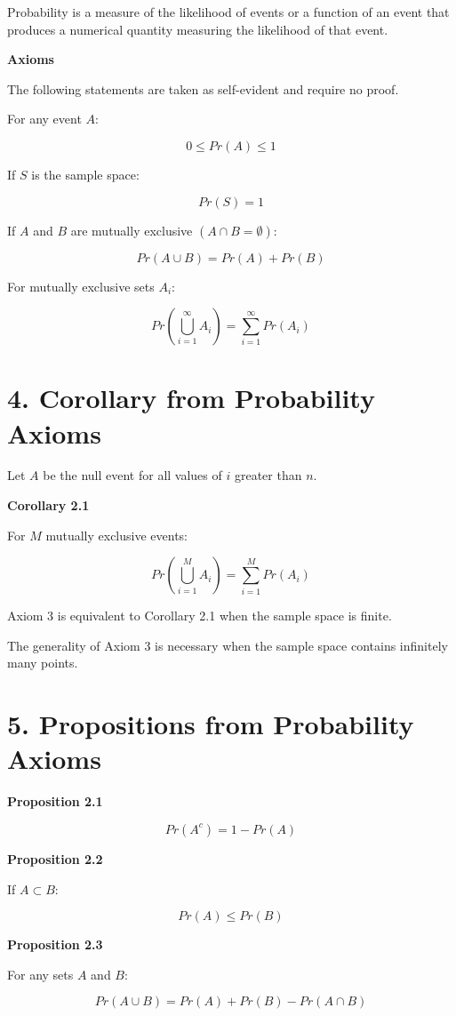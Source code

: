 \documentclass[12pt]{article}
\begin{document}
Probability is a measure of the likelihood of events or a function of an event that produces a numerical quantity measuring the likelihood of that event.

\textbf{Axioms}

The following statements are taken as self-evident and require no proof.

For any event $A$:

\[
0 \le Pr(A) \le 1
\]

If $S$ is the sample space:

\[
Pr(S) = 1
\]

If $A$ and $B$ are mutually exclusive $(A \cap B = \emptyset)$:

\[
Pr(A \cup B) = Pr(A) + Pr(B)
\]

For mutually exclusive sets $A_i$:

\[
Pr\left(\bigcup_{i=1}^{\infty} A_i \right) =
\sum_{i=1}^{\infty} Pr(A_i)
\]

\section*{4. Corollary from Probability Axioms}

Let $A$ be the null event for all values of $i$ greater than $n$.

\textbf{Corollary 2.1}

For $M$ mutually exclusive events:

\[
Pr\left(\bigcup_{i=1}^{M} A_i \right) =
\sum_{i=1}^{M} Pr(A_i)
\]

Axiom 3 is equivalent to Corollary 2.1 when the sample space is finite.

The generality of Axiom 3 is necessary when the sample space contains infinitely many points.

\section*{5. Propositions from Probability Axioms}

\textbf{Proposition 2.1}

\[
Pr(A^c) = 1 - Pr(A)
\]

\textbf{Proposition 2.2}

If $A \subset B$:

\[
Pr(A) \le Pr(B)
\]

\textbf{Proposition 2.3}

For any sets $A$ and $B$:

\[
Pr(A \cup B) = Pr(A) + Pr(B) - Pr(A \cap B)
\]
\end{document}
